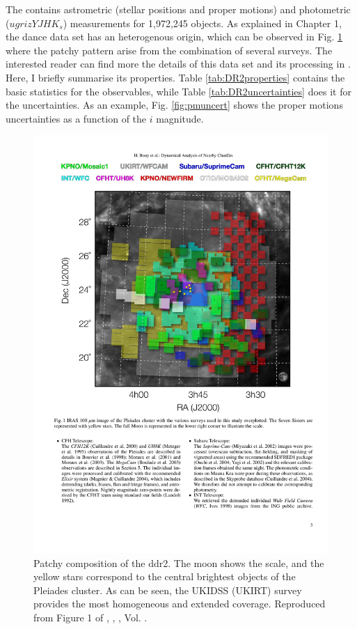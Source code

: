 The  contains astrometric (stellar positions and proper motions) and photometric ($ugrizYJHK_s$) measurements for 1,972,245 objects. As explained in Chapter 1, the \gls{dance} data set has an heterogenous origin, which can be observed in Fig. \ref{fig:originDANCeDR2} where the patchy pattern arise from the combination of several surveys. The interested reader can find more the details of this data set and its processing in \citet{Bouy2013,Bouy2015}. Here, I briefly summarise its properties. Table \ref{tab:DR2properties} contains the basic statistics for the observables, while Table \ref{tab:DR2uncertainties} does it for the uncertainties. As an example, Fig. \ref{fig:pmuncert} shows the proper motions uncertainties as a function of the $i$ magnitude.

\begin{figure}[ht!]
\begin{center}
\includegraphics[width=\textwidth]{background/Figures/F1_Bouy2013.pdf}
\caption{Patchy composition of the \gls{ddr2}. The moon shows the scale, and the yellow stars correspond to the central brightest objects of the Pleiades cluster. As can be seen, the UKIDSS (UKIRT) survey provides the most homogeneous and extended coverage. Reproduced from Figure 1 of \citet{Bouy2013}, \textit{}, , Vol. .}
\label{fig:originDANCeDR2}
\end{center}
\end{figure}

